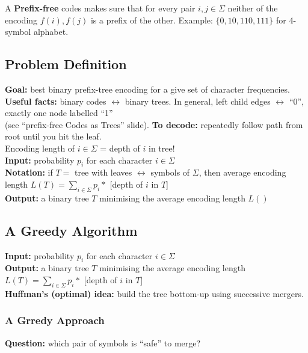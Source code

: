 \documentclass{scrartcl}
\begin{document}
A {\bf Prefix-free } codes makes sure that for every pair $i, j \in \Sigma$
neither of the encoding $f(i), f(j)$ is a prefix of the other. Example: $\{0,
10, 110, 111\}$ for 4-symbol alphabet.
\subsection{Problem Definition}
\label{sec:7-2}
{\bf Goal: } best binary prefix-tree encoding for a give set of character
frequencies. \\
{\bf Useful facts: } binary codes $\leftrightarrow$ binary trees. In general,
left child edges $\leftrightarrow$ ``0'', exactly one node labelled ``1''\\
(see ``prefix-free Codes as Trees'' slide).
{\bf To decode: }  repeatedly follow path from root until you hit the leaf.\\
Encoding length of $i \in \Sigma$ = depth of $i$ in tree!\\

{\bf Input: } probability $p_i$ for each character $i \in \Sigma$\\

{\bf Notation: } if $T = $ tree with leaves $\leftrightarrow$ symbols of
$\Sigma$, then average encoding length $L(T) = \sum \limits_{i \in \Sigma} p_i
*$ [depth of $i$ in $T$]\\

{\bf Output: } a binary tree $T$ minimising the average encoding length $L()$
\subsection{A Greedy Algorithm}
\label{sec:7-3}

{\bf Input: } probability $p_i$ for each character $i \in \Sigma$\\

{\bf Output: } a binary tree $T$ minimising the average encoding length $L(T) =
\sum \limits_{i \in \Sigma} p_i *$ [depth of $i$ in $T$]\\

{\bf Huffman's (optimal) idea: } build the tree bottom-up using successive
mergers. 

\subsubsection{A Grredy Approach}
\label{sec:7-3-1}

{\bf Question: } which pair of symbols is ``safe'' to merge?
\end{document}
